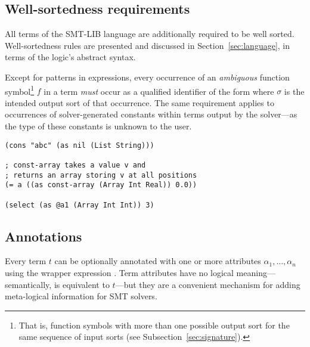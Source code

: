 \subsection{Well-sortedness requirements} \label{well-sortedness}

All terms of the SMT-LIB language are additionally required to be well sorted.
Well-sortedness rules are presented and discussed in Section~\ref{sec:language},
in terms of the logic's abstract syntax.

Except for patterns in  expressions,
every occurrence of an \emph{ambiguous} function symbol\footnote{%
That is, function symbols with more than one possible output sort 
for the same sequence of input sorts (see Subsection~\ref{sec:signature}).
}
$f$ in a term \emph{must} occur as a qualified identifier of the form
 where $\sigma$ is the intended output sort
of that occurrence.
The same requirement applies to occurrences of solver-generated constants
within terms output by the solver---as the type of these constants is unknown
to the user.

\begin{lstlisting}[linewidth=32em]
(cons "abc" (as nil (List String)))

; const-array takes a value v and
; returns an array storing v at all positions
(= a ((as const-array (Array Int Real)) 0.0))

(select (as @a1 (Array Int Int)) 3)
\end{lstlisting}


\subsection{Annotations}
Every term $t$ can be optionally annotated with one or more attributes 
$\alpha_1,\ldots,\alpha_n$
using the wrapper expression .
Term attributes have no logical meaning---semantically,
 is equivalent to $t$---but 
they are a convenient mechanism for adding meta-logical information 
for SMT solvers.

